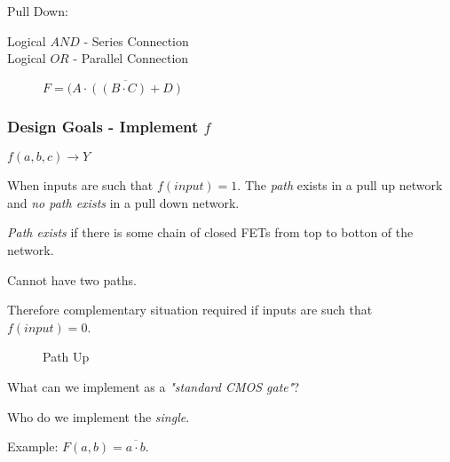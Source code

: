 \documentclass[a4paper,12pt]{article}
\begin{document}
Pull Down:

Logical $AND$ - Series Connection \\
Logical $OR$  - Parallel Connection

\begin{figure}[tbtp]


\caption{$F = \overline{(A \cdot ((B \cdot C) + D)}$}

\end{figure}

\subsubsection*{Design Goals - Implement $f$}

$f(a, b, c) \to Y$

When inputs are such that $f(input) = 1$. The \emph{path} exists in a
pull up network and \emph{no path exists} in a pull down network.

\emph{Path exists} if there is some chain of closed FETs from top to
botton of the network.

Cannot have two paths.

\begin{figure}


\end{figure}

Therefore complementary situation required if inputs are such that
$f(input) = 0$.

\begin{figure}


\end{figure}

\begin{figure}



\caption{Path Up}

\end{figure}

What can we implement as a \emph{"standard CMOS gate"}?

Who do we implement the \emph{single}.

Example: $F(a, b) = \overline{a \cdot b}$.


\begin{figure}[hbt] 
\centering 



\label{NAND Gate} 

\end{figure} 
\end{document}
